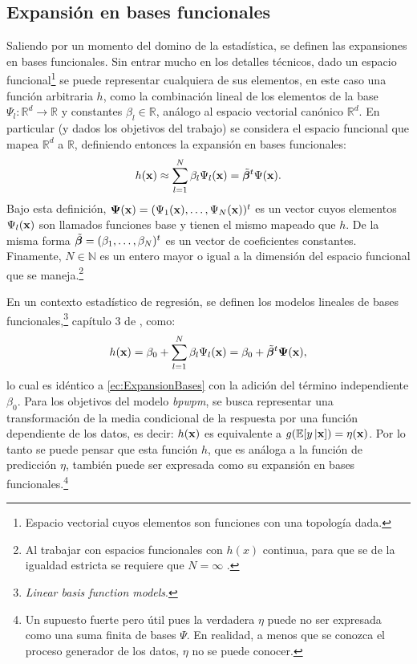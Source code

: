 \documentclass[../Main/Main.tex]{subfiles}
\begin{document}
\subsection{Expansión en bases funcionales}
Saliendo por un momento del domino de la estadística, se definen las expansiones en bases funcionales. Sin entrar mucho en los detalles técnicos, dado un espacio funcional\footnote{Espacio vectorial cuyos elementos son funciones con una topología dada.} se puede representar cualquiera de sus elementos, en este caso una función arbitraria $h$, como la combinación lineal de los elementos de la base $\Psi_l:\mathbb{R} ^d\rightarrow\mathbb{R}$  y constantes $\beta_l\in\mathbb{R}$, análogo al espacio vectorial canónico $\mathbb{R}^d$. En particular (y dados los objetivos del trabajo) se considera el espacio funcional que mapea $\mathbb{R}^d$ a $\mathbb{R}$, definiendo entonces la expansión en bases funcionales: 
\begin{align} 
	h(\mathbf{x}) \approx \sum_{l = 1}^{N}\beta_l\Psi_l(\mathbf{x}) = \tilde{\bm{\beta}}^t\Psi(\mathbf{x}). \label{ec:ExpansionBases}
\end{align}
Bajo esta definición, $\bm{\Psi}(\mathbf{x}) = (\Psi_1(\mathbf{x}),\ldots,\Psi_{N}(\mathbf{x}))^t$ es un vector cuyos elementos $\Psi_l(\mathbf{x})$ son llamados funciones base y tienen el mismo mapeado que $h$. De la misma forma $\tilde{\bm{\beta}} = (\beta_1,\ldots,\beta_{N})^t$ es un vector de coeficientes constantes. Finamente, $N\in\mathbb{N}$ es un entero mayor o igual a la dimensión del espacio funcional que se maneja.\footnote{Al trabajar con espacios funcionales con $h(x)$ continua, para que se de la igualdad estricta se requiere que $N = \infty$ \autocite{bergstrom1985estimation}.}

En un contexto estadístico de regresión, se definen los modelos lineales de bases funcionales,\footnote{\textit{Linear basis function models}.} capítulo 3 de \citet{bishop2006pattern}, como:
\begin{align} 
	h(\mathbf{x}) = \beta_0 + \sum_{l = 1}^{N} \beta_l\Psi_l(\mathbf{x}) = \beta_0 + \tilde{\bm{\beta}}^t\bm{\Psi}(\mathbf{x}), \label{ec:LBFM}
\end{align}
lo cual es idéntico a \eqref{ec:ExpansionBases} con la adición del término independiente $\beta_0$. Para los objetivos del modelo \textit{bpwpm}, se busca representar una transformación de la media condicional de la respuesta por una función dependiente de los datos, es decir: $h(\mathbf{x})$ es equivalente a $g(\mathbb{E}[y\,|\mathbf{x}]) = \eta(\mathbf{x})$. Por lo tanto se puede pensar que esta función $h$, que es análoga a la función de predicción $\eta$, también puede ser expresada como su expansión en bases funcionales.\footnote{Un supuesto fuerte pero útil pues la verdadera $\eta$ puede no ser expresada como una suma finita de bases $\Psi$. En realidad, a menos que se conozca el proceso generador de los datos, $\eta$ no se puede conocer.} 
\end{document}
